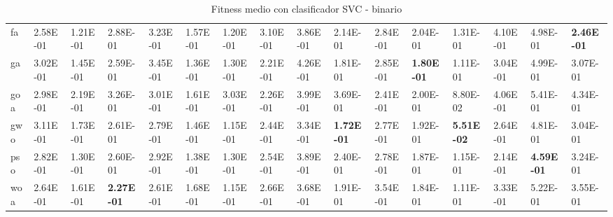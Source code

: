 \begin{table}
\begin{adjustbox}{width=\linewidth}
\begin{tabular}{llllllllllllllll}
            fa        & 2.58E-01          & 1.21E-01          & 2.88E-01          & 3.23E-01          & 1.57E-01          & 1.20E-01          & 3.10E-01          & 3.86E-01          & 2.14E-01          & 2.84E-01          & 2.04E-01          & 1.31E-01          & 4.10E-01          & 4.98E-01          & \textbf{2.46E-01}\tabularnewline
            ga        & 3.02E-01          & 1.45E-01          & 2.59E-01          & 3.45E-01          & 1.36E-01          & 1.30E-01          & 2.21E-01          & 4.26E-01          & 1.81E-01          & 2.85E-01          & \textbf{1.80E-01} & 1.11E-01          & 3.04E-01          & 4.99E-01          & 3.07E-01\tabularnewline
            goa       & 2.98E-01          & 2.19E-01          & 3.26E-01          & 3.01E-01          & 1.61E-01          & 3.03E-01          & 2.26E-01          & 3.99E-01          & 3.69E-01          & 2.41E-01          & 2.00E-01          & 8.80E-02          & 4.06E-01          & 5.41E-01          & 4.34E-01\tabularnewline
            gwo       & 3.11E-01          & 1.73E-01          & 2.61E-01          & 2.79E-01          & 1.46E-01          & 1.15E-01          & 2.44E-01          & 3.34E-01          & \textbf{1.72E-01} & 2.77E-01          & 1.92E-01          & \textbf{5.51E-02} & 2.64E-01          & 4.81E-01          & 3.04E-01\tabularnewline
            pso       & 2.82E-01          & 1.30E-01          & 2.60E-01          & 2.92E-01          & 1.38E-01          & 1.30E-01          & 2.54E-01          & 3.89E-01          & 2.40E-01          & 2.78E-01          & 1.87E-01          & 1.15E-01          & 2.14E-01          & \textbf{4.59E-01} & 3.24E-01\tabularnewline
            woa       & 2.64E-01          & 1.61E-01          & \textbf{2.27E-01} & 2.61E-01          & 1.68E-01          & 1.15E-01          & 2.66E-01          & 3.68E-01          & 1.91E-01          & 3.54E-01          & 1.84E-01          & 1.11E-01          & 3.33E-01          & 5.22E-01          & 3.55E-01\tabularnewline
            \bottomrule
        \end{tabular}
    \end{adjustbox}
    \caption{Fitness medio con clasificador SVC - binario}
    \label{tab:fitness_svc}
\end{table}

